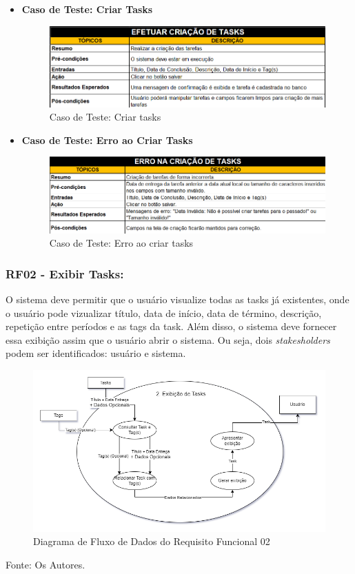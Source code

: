 \documentclass[a4paper,12pt]{article}
\begin{document}
\begin{itemize}
	\item\textbf{Caso de Teste: Criar Tasks}
	\begin{figure}
		\centering
		\includegraphics[scale=0.75]{UnitTest/trueCase/createTask.png}
		\caption{Caso de Teste: Criar tasks}
	\end{figure}
	\item\textbf{Caso de Teste: Erro ao Criar Tasks}
	\begin{figure}
		\centering
		\includegraphics[scale=0.75]{UnitTest/falseCase/createTask.png}
		\caption{Caso de Teste: Erro ao criar tasks}
	\end{figure}
\end{itemize}

\pagebreak
\subsubsection{RF02 - Exibir Tasks:}
O sistema deve permitir que o usuário visualize todas as tasks já existentes, onde o usuário pode vizualizar 
título, data de início, data de término, descrição, repetição entre períodos e as tags da task. Além disso, o 
sistema deve fornecer essa exibição assim que o usuário abrir o sistema. Ou seja, dois \textit{stakesholders} 
podem ser identificados: usuário e sistema.
\begin{figure}[H]
	\centering
	\includegraphics[scale=0.45]{DFDs/RF02.drawio.png}
	\caption{Diagrama de Fluxo de Dados do Requisito Funcional 02}
\end{figure}
\noindent Fonte: Os Autores.
\end{document}

